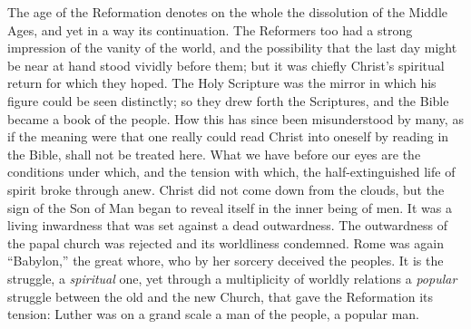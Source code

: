 \documentclass[12pt,a4paper,openany]{book}
\newcommand{\opage}[1]{\marginnote{\footnotesize\textit{[#1]}}}
\begin{document}
The age of the Reformation denotes on the whole the dissolution
of the Middle Ages, and yet in a way its continuation.
The Reformers too had a strong
impression of the vanity of the world, and the possibility that
the last day might be near at hand stood
vividly before them; but it was chiefly Christ's
spiritual return for which they hoped. The Holy
Scripture was the mirror in which his figure could be seen
distinctly; so they drew forth the Scriptures, and the Bible became a
book of the people. How this has since been
misunderstood by many, as if the meaning were that one really
could read Christ into oneself by reading in the Bible, shall
not be treated here. What we have before our eyes are the conditions
under which, and the tension with which, the
half-extinguished life of spirit broke through anew. Christ
did not come down from the clouds, but the sign of the Son of Man
\setcounter{footnote}{0}%
\opage{50}began to reveal itself in the inner being of men. It
was a living inwardness that was set against a dead outwardness.
The outwardness of the papal church was rejected and its worldliness
condemned. Rome was again ``Babylon,'' the great
whore, who by her sorcery deceived the peoples. It
is the struggle, a \emph{spiritual} one, yet through a multiplicity
of worldly relations a \emph{popular} struggle between
the old and the new Church, that gave the Reformation
its tension: Luther was on a grand scale a man of the people,
a popular man.
\end{document}
